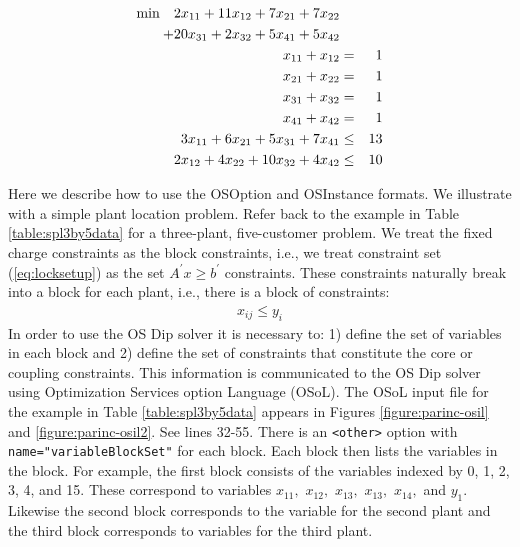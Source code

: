  
\begin{eqnarray*}
{\rm min} \quad 2 x_{11} + 11 x_{12} + 7 x_{21} + 7 x_{22} && \\
+ 20 x_{31} + 2 x_{32} + 5 x_{41} + 5x_{42} && \\
x_{11} + x_{12}  &=&    1  \\
x_{21} + x_{22}  &=&    1 \\
x_{31} + x_{32} &=&    1 \\
x_{41} + x_{42} &=&    1 \\
3 x_{11} + 6 x_{21} + 5 x_{31} + 7 x_{41} &\le&   13 \\
2 x_{12} + 4 x_{22} + 10 x_{32} + 4 x_{42} &\le&   10
\end{eqnarray*}
 

\label{section:defineinstance}

Here we describe how to use the OSOption and OSInstance formats.  We illustrate
with a simple plant location problem. Refer back to the example in Table
\ref{table:spl3by5data} for a three-plant, five-customer problem. We treat the
fixed charge constraints as the block constraints, i.e., we treat constraint set
(\ref{eq:locksetup}) as the set $A^{\prime} x \ge b^{\prime}$ constraints. These
constraints naturally break into a block for each plant, i.e., there is a block
of constraints:
\begin{eqnarray}
x_{ij} \le y_{i}
\end{eqnarray}
In order to use the OS Dip solver it is necessary to: 1) define the set of
variables in each block and 2) define the set of constraints that constitute the
core or coupling constraints. This information is communicated to the OS Dip
solver using Optimization Services option Language (OSoL). The OSoL input file
for the example in  Table \ref{table:spl3by5data} appears in Figures
\ref{figure:parinc-osil} and \ref{figure:parinc-osil2}.  See lines 32-55. There
is an {\tt <other>} option with {\tt name="variableBlockSet"} for each block.
Each block then lists the variables in the block. For example, the first block
consists of the variables indexed by 0, 1, 2, 3, 4, and 15. These correspond to
variables $x_{11},$  $x_{12},$  $x_{13},$  $x_{13},$ $x_{14},$ and  $y_{1}.$
Likewise the second block corresponds to the variable for the second plant and
the third block corresponds to variables for the third plant.


  

